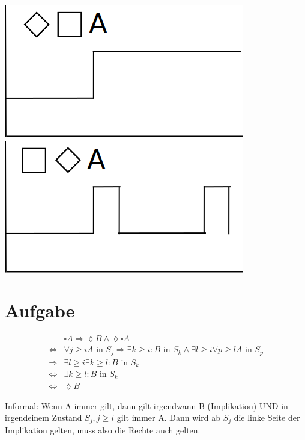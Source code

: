 \includegraphics[width=\textwidth / 2]{./1_a.png}
\includegraphics[width=\textwidth / 2 ]{./1_b.png}

\section{Aufgabe}

\begin{align}
	& \square A \Rightarrow \lozenge B \land \lozenge \square A \\
	\Leftrightarrow & \forall j \geq i A \text{ in } S_j \Rightarrow \exists k \geq i: B \text { in } S_k \land \exists l \geq i \forall p \geq l A \text{ in } S_p \\
	\Rightarrow & \exists l \geq i \exists k \geq l: B \text{ in } S_k \\
	\Leftrightarrow & \exists k \geq l: B \text{ in } S_k \\
	\Leftrightarrow & \lozenge B 
\end{align}

Informal: Wenn A immer gilt, dann gilt irgendwann B (Implikation) UND in irgendeinem Zustand $S_j, j \geq i$ gilt immer A. Dann wird ab $S_j$ die linke Seite der Implikation gelten, muss also die Rechte auch gelten.

